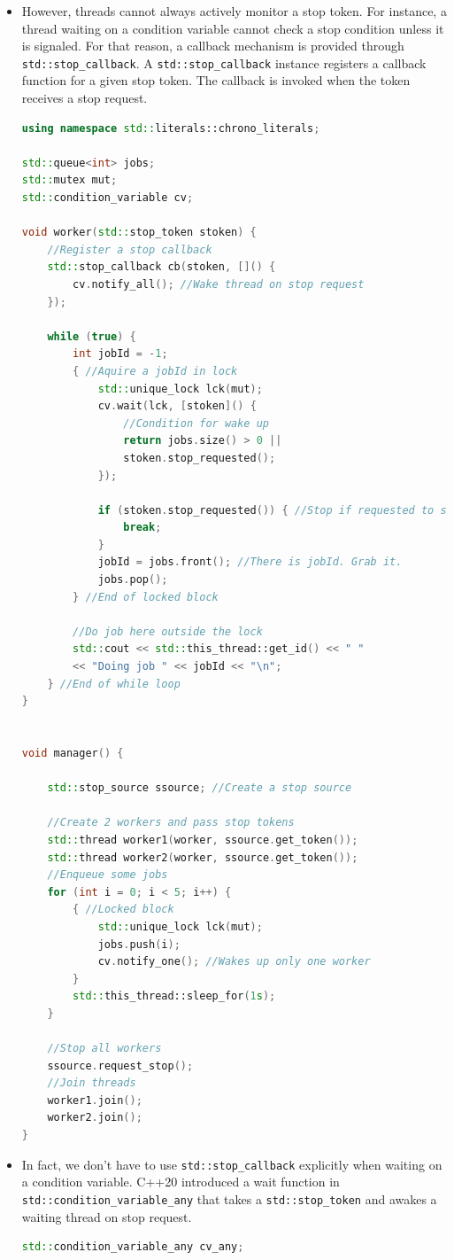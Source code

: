\documentclass[a4paper,11pt,twoside]{book}
\begin{document}
\begin{itemize}
\item However, threads cannot always actively monitor a stop token. For instance, a thread waiting on a condition variable cannot check a stop condition unless it is signaled. For that reason, a callback mechanism is provided through \texttt{std::stop\_callback}. A \texttt{std::stop\_callback} instance registers a callback function for a given stop token. The callback is invoked when the token receives a stop request.

\begin{lstlisting}[frame=single, language=c++]
using namespace std::literals::chrono_literals;

std::queue<int> jobs;
std::mutex mut;
std::condition_variable cv;

void worker(std::stop_token stoken) {
	//Register a stop callback  
	std::stop_callback cb(stoken, []() {
		cv.notify_all(); //Wake thread on stop request
	});
	
	while (true) {
		int jobId = -1;
		{ //Aquire a jobId in lock
			std::unique_lock lck(mut);
			cv.wait(lck, [stoken]() {
				//Condition for wake up
				return jobs.size() > 0 ||
				stoken.stop_requested();
			});
			
			if (stoken.stop_requested()) { //Stop if requested to stop
				break;
			}
			jobId = jobs.front(); //There is jobId. Grab it.
			jobs.pop();
		} //End of locked block
		
		//Do job here outside the lock
		std::cout << std::this_thread::get_id() << " "
		<< "Doing job " << jobId << "\n";
	} //End of while loop
}


void manager() {
	
	std::stop_source ssource; //Create a stop source
	
	//Create 2 workers and pass stop tokens
	std::thread worker1(worker, ssource.get_token());
	std::thread worker2(worker, ssource.get_token());
	//Enqueue some jobs
	for (int i = 0; i < 5; i++) {
		{ //Locked block
			std::unique_lock lck(mut);
			jobs.push(i);
			cv.notify_one(); //Wakes up only one worker
		}
		std::this_thread::sleep_for(1s);
	}
	
	//Stop all workers
	ssource.request_stop();
	//Join threads
	worker1.join();
	worker2.join();
}	
\end{lstlisting}


\item In fact, we don't have to use \texttt{std::stop\_callback} explicitly when waiting on a condition variable. C++20 introduced a wait function in \texttt{std::condition\_variable\_any} that takes a \texttt{std::stop\_token} and awakes a waiting thread on stop request. 
\begin{lstlisting}[frame=single, language=c++]	
std::condition_variable_any cv_any;


\end{lstlisting}
\end{itemize}
\end{document}
